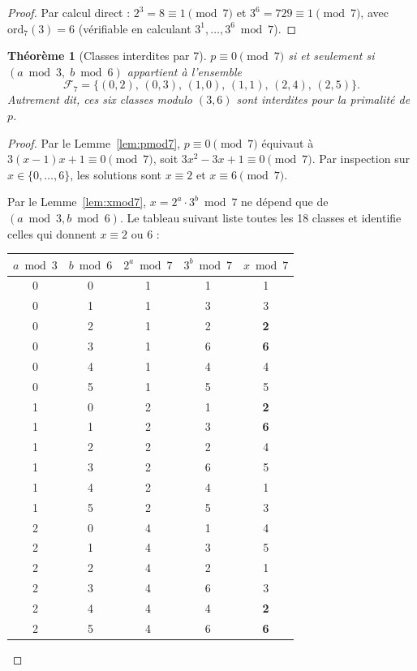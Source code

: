 \documentclass[12pt,a4paper]{article}
\newtheorem{theoreme}{Théorème}
\theoremstyle{definition}
\newcommand{\ord}{\mathrm{ord}}
\begin{document}
\begin{proof}
  Par calcul direct : $2^3 = 8 \equiv 1 \pmod{7}$ et
  $3^6 = 729 \equiv 1 \pmod{7}$, avec $\ord_7(3) = 6$
  (vérifiable en calculant $3^1, \ldots, 3^6 \bmod 7$).
\end{proof}

\begin{theoreme}[Classes interdites par 7]\label{thm:mod7}
  $p \equiv 0 \pmod{7}$ si et seulement si
  $(a \bmod 3,\; b \bmod 6)$ appartient à l'ensemble
  \[
    \mathcal{F}_7 = \{(0,2),\,(0,3),\,(1,0),\,(1,1),\,(2,4),\,(2,5)\}.
  \]
  Autrement dit, ces six classes modulo $(3, 6)$ sont \emph{interdites}
  pour la primalité de $p$.
\end{theoreme}

\begin{proof}
  Par le Lemme~\ref{lem:pmod7}, $p \equiv 0 \pmod 7$ équivaut à
  $3(x-1)x + 1 \equiv 0 \pmod{7}$, soit $3x^2 - 3x + 1 \equiv 0 \pmod{7}$.
  Par inspection sur $x \in \{0,\ldots,6\}$, les solutions sont
  $x \equiv 2$ et $x \equiv 6 \pmod{7}$.

  Par le Lemme~\ref{lem:xmod7}, $x = 2^a \cdot 3^b \bmod 7$ ne dépend
  que de $(a \bmod 3, b \bmod 6)$.
  Le tableau suivant liste toutes les 18 classes et identifie
  celles qui donnent $x \equiv 2$ ou $6$ :

  \begin{center}
  \renewcommand{\arraystretch}{1.2}
  \begin{tabular}{ccccc}
    \toprule
    $a \bmod 3$ & $b \bmod 6$ & $2^a \bmod 7$ & $3^b \bmod 7$
      & $x \bmod 7$ \\
    \midrule
    0 & 0 & 1 & 1 & 1 \\
    0 & 1 & 1 & 3 & 3 \\
    \rowcolor{red!15}
    0 & 2 & 1 & 2 & \textbf{2} \\
    \rowcolor{red!15}
    0 & 3 & 1 & 6 & \textbf{6} \\
    0 & 4 & 1 & 4 & 4 \\
    0 & 5 & 1 & 5 & 5 \\
    \midrule
    \rowcolor{red!15}
    1 & 0 & 2 & 1 & \textbf{2} \\
    \rowcolor{red!15}
    1 & 1 & 2 & 3 & \textbf{6} \\
    1 & 2 & 2 & 2 & 4 \\
    1 & 3 & 2 & 6 & 5 \\
    1 & 4 & 2 & 4 & 1 \\
    1 & 5 & 2 & 5 & 3 \\
    \midrule
    2 & 0 & 4 & 1 & 4 \\
    2 & 1 & 4 & 3 & 5 \\
    2 & 2 & 4 & 2 & 1 \\
    2 & 3 & 4 & 6 & 3 \\
    \rowcolor{red!15}
    2 & 4 & 4 & 4 & \textbf{2} \\
    \rowcolor{red!15}
    2 & 5 & 4 & 6 & \textbf{6} \\
    \bottomrule
  \end{tabular}
  \end{center}


\end{proof}
\end{document}
